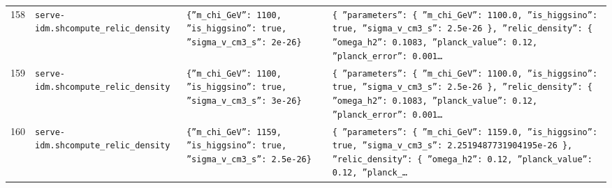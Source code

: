 \documentclass[11pt,a4paper]{article}
\begin{document}
\begin{longtable}{@{}p{}p{}p{}p{}@{}}
158 & \texttt{serve-idm.sh}\newline\texttt{compute\_\allowbreak{}relic\_\allowbreak{}density} & \texttt{\{''m\_\allowbreak{}chi\_\allowbreak{}GeV'':\allowbreak{} 1100,\allowbreak{} ''is\_\allowbreak{}higgsino'':\allowbreak{} true,\allowbreak{} ''sigma\_\allowbreak{}v\_\allowbreak{}cm3\_\allowbreak{}s'':\allowbreak{} 2e-26\}\allowbreak{}} & \texttt{\{   ''parameters'':\allowbreak{} \{     ''m\_\allowbreak{}chi\_\allowbreak{}GeV'':\allowbreak{} 1100.0,\allowbreak{}     ''is\_\allowbreak{}higgsino'':\allowbreak{} true,\allowbreak{}     ''sigma\_\allowbreak{}v\_\allowbreak{}cm3\_\allowbreak{}s'':\allowbreak{} 2.5e-26   \}\allowbreak{},\allowbreak{}   ''relic\_\allowbreak{}density'':\allowbreak{} \{     ''omega\_\allowbreak{}h2'':\allowbreak{} 0.1083,\allowbreak{}     ''planck\_\allowbreak{}value'':\allowbreak{} 0.12,\allowbreak{}     ''planck\_\allowbreak{}error'':\allowbreak{} 0.001\ldots{}\allowbreak{}} \\
159 & \texttt{serve-idm.sh}\newline\texttt{compute\_\allowbreak{}relic\_\allowbreak{}density} & \texttt{\{''m\_\allowbreak{}chi\_\allowbreak{}GeV'':\allowbreak{} 1100,\allowbreak{} ''is\_\allowbreak{}higgsino'':\allowbreak{} true,\allowbreak{} ''sigma\_\allowbreak{}v\_\allowbreak{}cm3\_\allowbreak{}s'':\allowbreak{} 3e-26\}\allowbreak{}} & \texttt{\{   ''parameters'':\allowbreak{} \{     ''m\_\allowbreak{}chi\_\allowbreak{}GeV'':\allowbreak{} 1100.0,\allowbreak{}     ''is\_\allowbreak{}higgsino'':\allowbreak{} true,\allowbreak{}     ''sigma\_\allowbreak{}v\_\allowbreak{}cm3\_\allowbreak{}s'':\allowbreak{} 2.5e-26   \}\allowbreak{},\allowbreak{}   ''relic\_\allowbreak{}density'':\allowbreak{} \{     ''omega\_\allowbreak{}h2'':\allowbreak{} 0.1083,\allowbreak{}     ''planck\_\allowbreak{}value'':\allowbreak{} 0.12,\allowbreak{}     ''planck\_\allowbreak{}error'':\allowbreak{} 0.001\ldots{}\allowbreak{}} \\
160 & \texttt{serve-idm.sh}\newline\texttt{compute\_\allowbreak{}relic\_\allowbreak{}density} & \texttt{\{''m\_\allowbreak{}chi\_\allowbreak{}GeV'':\allowbreak{} 1159,\allowbreak{} ''is\_\allowbreak{}higgsino'':\allowbreak{} true,\allowbreak{} ''sigma\_\allowbreak{}v\_\allowbreak{}cm3\_\allowbreak{}s'':\allowbreak{} 2.5e-26\}\allowbreak{}} & \texttt{\{   ''parameters'':\allowbreak{} \{     ''m\_\allowbreak{}chi\_\allowbreak{}GeV'':\allowbreak{} 1159.0,\allowbreak{}     ''is\_\allowbreak{}higgsino'':\allowbreak{} true,\allowbreak{}     ''sigma\_\allowbreak{}v\_\allowbreak{}cm3\_\allowbreak{}s'':\allowbreak{} 2.2519487731904195e-26   \}\allowbreak{},\allowbreak{}   ''relic\_\allowbreak{}density'':\allowbreak{} \{     ''omega\_\allowbreak{}h2'':\allowbreak{} 0.12,\allowbreak{}     ''planck\_\allowbreak{}value'':\allowbreak{} 0.12,\allowbreak{}     ''planck\_\allowbreak{}\ldots{}\allowbreak{}} \\

\end{longtable}
\end{document}
